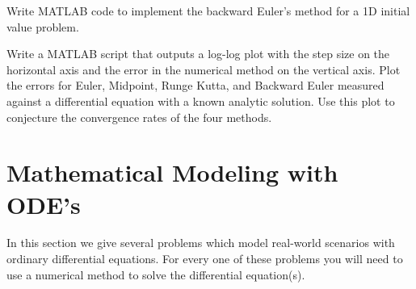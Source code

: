 \begin{problem}
    Write MATLAB code to implement the backward Euler's method for a 1D initial value
    problem. \\
\end{problem}


\begin{problem}
    Write a MATLAB script that outputs a log-log plot with the step size on the horizontal
    axis and the error in the numerical method on the vertical axis.  Plot the errors for
    Euler, Midpoint, Runge Kutta, and Backward Euler measured against a differential
    equation with a known analytic solution.  Use this plot to conjecture the convergence
    rates of the four methods.
\end{problem}


\newpage\section{Mathematical Modeling with ODE's}
In this section we give several problems which model real-world scenarios with ordinary
differential equations.  For every one of these problems you will need to use a numerical
method to solve the differential equation(s).

